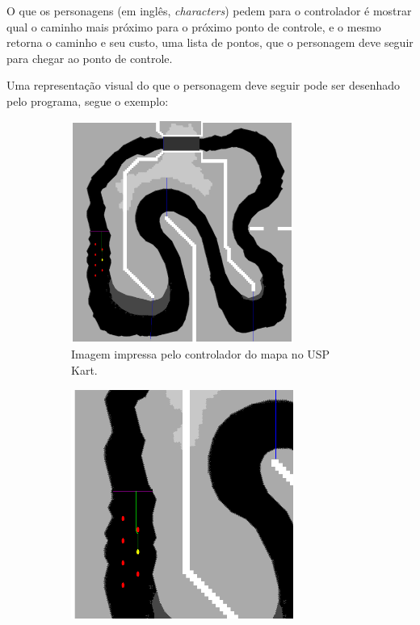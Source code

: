O que os personagens (em inglês, \textit{characters}) pedem para o controlador é mostrar qual o caminho mais próximo para o próximo ponto de controle, e o mesmo retorna o caminho e seu custo, uma lista de pontos, que o personagem deve seguir para chegar ao ponto de controle.

Uma representação visual do que o personagem deve seguir pode ser desenhado pelo programa, segue o exemplo:

\begin{figure}[H]
    \centering
    \begin{subfigure}[t]{0.45\textwidth}
        \centering
        \includegraphics[width=0.8\textwidth]{figuras/Mapa modelado.png}
        \caption{Imagem impressa pelo controlador do mapa no USP Kart.}
        \label{fig:mapa-modelado}
    \end{subfigure}
    \hfill
    \begin{subfigure}[t]{0.45\textwidth}
        \centering
        \includegraphics[width=0.8\textwidth]{figuras/Mapa modelado cortado.png}

\end{subfigure}
\end{figure}
